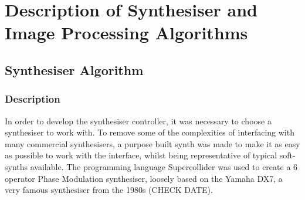 \documentclass[11pt, oneside]{report}   	%
\begin{document}
\chapter{Description of Synthesiser and Image Processing Algorithms}
\section{Synthesiser Algorithm}
\subsection{Description}
In order to develop the synthesiser controller, it was necessary to choose a synthesiser to work with. To remove some of the complexities of interfacing with many commercial synthesisers, a purpose built synth was made to make it as easy as possible to work with the interface, whilst being representative of typical soft-synths available.
The programming language Supercollider was used to create a 6 operator Phase Modulation synthesiser, loosely based on the Yamaha DX7, a very famous synthesiser from the 1980s (CHECK DATE).
 
\end{document}
